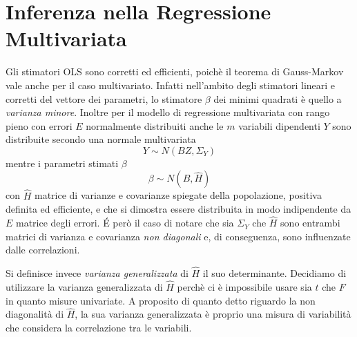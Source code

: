 \documentclass[a4page, 11pt]{article} %
\begin{document}
\section{Inferenza nella Regressione Multivariata}
Gli stimatori OLS sono corretti ed efficienti, poichè il teorema di Gauss-Markov vale anche per il caso multivariato. Infatti nell'ambito degli stimatori lineari e corretti del vettore dei parametri, lo stimatore $\beta$ dei minimi quadrati è quello a \textit{varianza minore}. Inoltre per il modello di regressione multivariata con rango pieno con errori $E$ normalmente distribuiti anche le $m$ variabili dipendenti $Y$ sono distribuite secondo una normale multivariata $$Y \sim N(BZ, \Sigma_Y)$$ mentre i parametri stimati $\beta$ $$\beta \sim N(B,\hat{H})$$ con $\hat{H}$ matrice di varianze e covarianze spiegate della popolazione, positiva definita ed efficiente, e che si dimostra essere distribuita in modo indipendente da $E$ matrice degli errori.
\'{E} però il caso di notare che sia $\Sigma_Y$ che $\hat{H}$ sono entrambi matrici di varianza e covarianza \textit{non diagonali} e, di conseguenza, sono influenzate dalle correlazioni.

Si definisce invece \textit{varianza generalizzata} di $\hat{H}$ il suo determinante. Decidiamo di utilizzare la varianza generalizzata di $\hat{H}$ perchè ci è impossibile usare sia $t$ che $F$ in quanto misure univariate. A proposito di quanto detto riguardo la non diagonalità di $\hat{H}$, la sua varianza generalizzata è proprio una misura di variabilità che considera la correlazione tra le variabili. 
\end{document}
